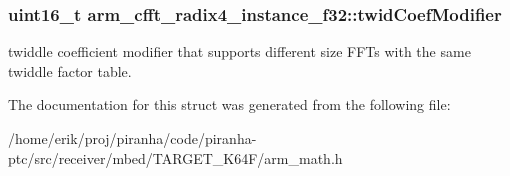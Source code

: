 \subsubsection[{\texorpdfstring{twid\+Coef\+Modifier}{twidCoefModifier}}]{\setlength{\rightskip}{0pt plus 5cm}uint16\+\_\+t arm\+\_\+cfft\+\_\+radix4\+\_\+instance\+\_\+f32\+::twid\+Coef\+Modifier}\hypertarget{structarm__cfft__radix4__instance__f32_abe31ea2157dfa233e389cdfd3b9993ee}{}\label{structarm__cfft__radix4__instance__f32_abe31ea2157dfa233e389cdfd3b9993ee}
twiddle coefficient modifier that supports different size F\+F\+Ts with the same twiddle factor table. 

The documentation for this struct was generated from the following file\+:\begin{DoxyCompactItemize}
\item 
/home/erik/proj/piranha/code/piranha-\/ptc/src/receiver/mbed/\+T\+A\+R\+G\+E\+T\+\_\+\+K64\+F/arm\+\_\+math.\+h\end{DoxyCompactItemize}
